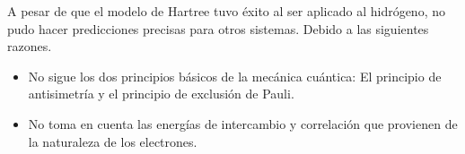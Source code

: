 \noindent A pesar de que el modelo de Hartree tuvo \'exito al ser aplicado al 
hidr\'ogeno, no pudo hacer predicciones precisas para otros sistemas. Debido a 
las siguientes razones.

\begin{itemize}
    \item No sigue los dos principios b\'asicos de la mec\'anica cu\'antica: El 
    principio de antisimetr\'ia y el principio de exclusi\'on de Pauli.
    \item No toma en cuenta las energ\'ias de intercambio y correlaci\'on que 
    provienen de la naturaleza de los electrones.
\end{itemize}
